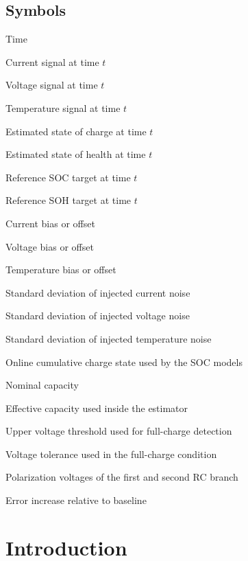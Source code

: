 \documentclass[review]{elsarticle}
\begin{document}
\subsection*{Symbols}
\begin{description}[style=multiline,leftmargin=1.7cm,font=\bfseries]
\item[$t$] Time
\item[$I(t)$] Current signal at time $t$
\item[$U(t)$] Voltage signal at time $t$
\item[$T(t)$] Temperature signal at time $t$
\item[$\widehat{\mathrm{SOC}}(t)$] Estimated state of charge at time $t$
\item[$\widehat{\mathrm{SOH}}(t)$] Estimated state of health at time $t$
\item[$\mathrm{SOC}_{\mathrm{ref}}(t)$] Reference SOC target at time $t$
\item[$\mathrm{SOH}_{\mathrm{ref}}(t)$] Reference SOH target at time $t$
\item[$\Delta I$] Current bias or offset
\item[$\Delta U$] Voltage bias or offset
\item[$\Delta T$] Temperature bias or offset
\item[$\sigma_I$] Standard deviation of injected current noise
\item[$\sigma_U$] Standard deviation of injected voltage noise
\item[$\sigma_T$] Standard deviation of injected temperature noise
\item[$Q_c$] Online cumulative charge state used by the SOC models
\item[$C_{\mathrm{nom}}$] Nominal capacity
\item[$C_{\mathrm{eff}}$] Effective capacity used inside the estimator
\item[$U_{\max}$] Upper voltage threshold used for full-charge detection
\item[$U_{\mathrm{tol}}$] Voltage tolerance used in the full-charge condition
\item[$U_{1},U_{2}$] Polarization voltages of the first and second RC branch
\item[$\Delta\mathrm{MAE}$] Error increase relative to baseline
\end{description}
\normalsize

\section{Introduction}
\end{document}

